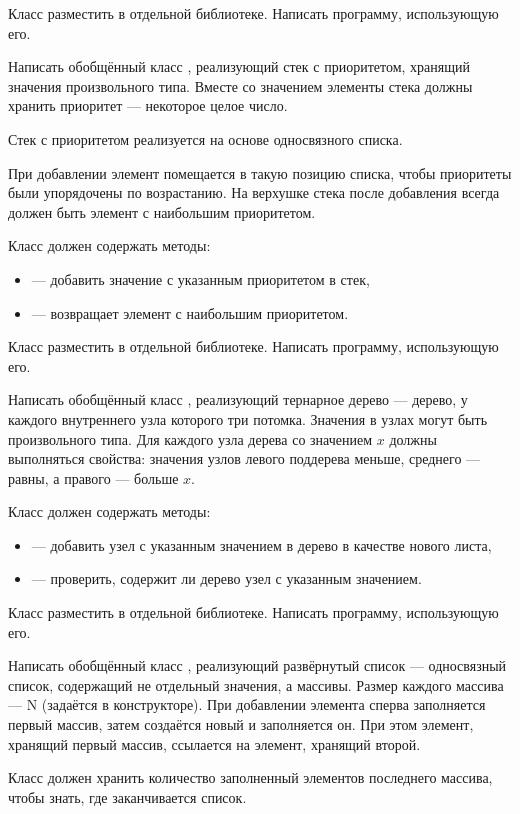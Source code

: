 Класс разместить в отдельной библиотеке. Написать программу,
использующую его.

\task Написать обобщённый класс , реализующий
стек с приоритетом, хранящий значения произвольного типа. Вместе со
значением элементы стека должны хранить приоритет — некоторое целое
число.

Стек с приоритетом реализуется на основе односвязного списка. 

При добавлении элемент помещается в такую позицию списка, чтобы
приоритеты были упорядочены по возрастанию. На верхушке стека после
добавления всегда должен быть элемент с наибольшим приоритетом.

Класс должен содержать методы:
\begin{itemize}
\item {} — добавить значение с указанным приоритетом в стек,
\item {} — возвращает элемент с наибольшим приоритетом.
\end{itemize}

Класс разместить в отдельной библиотеке. Написать программу,
использующую его.

\task Написать обобщённый класс , реализующий
тернарное дерево — дерево, у каждого внутреннего узла которого три
потомка. Значения в узлах могут быть произвольного типа. Для каждого
узла дерева со значением $x$ должны выполняться свойства: значения
узлов левого поддерева меньше, среднего — равны, а правого — больше
$x$.

Класс должен содержать методы:
\begin{itemize}
\item {} — добавить узел с указанным значением в дерево в
  качестве нового листа,
\item {} — проверить, содержит ли дерево узел с указанным
  значением.
\end{itemize}

Класс разместить в отдельной библиотеке. Написать программу,
использующую его.

\task Написать обобщённый класс , реализующий
развёрнутый список — односвязный список, содержащий не отдельный
значения, а массивы. Размер каждого массива — N (задаётся в
конструкторе). При добавлении элемента сперва заполняется первый
массив, затем создаётся новый и заполняется он. При этом элемент,
хранящий первый массив, ссылается на элемент, хранящий второй.

Класс должен хранить количество заполненный элементов последнего
массива, чтобы знать, где заканчивается список.

